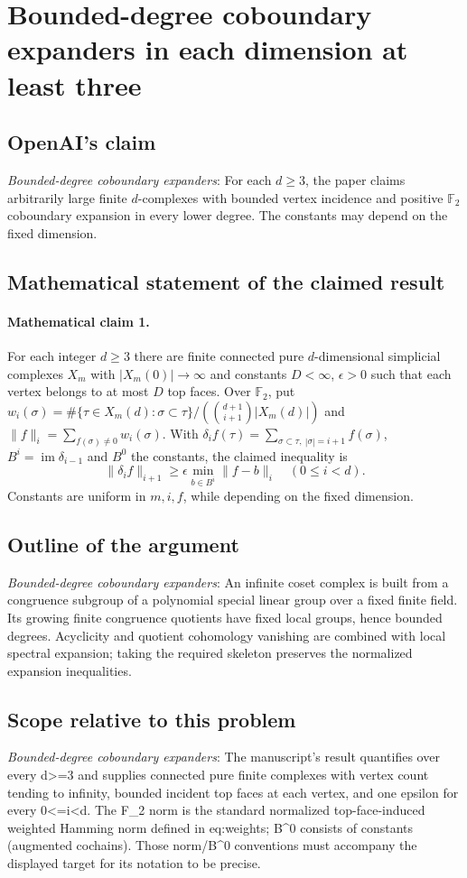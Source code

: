 \documentclass[11pt]{article}
\begin{document}
\section*{Bounded-degree coboundary expanders in each dimension at least three}

\subsection{OpenAI's claim}
\textit{Bounded-degree coboundary expanders}: For each $d\ge3$, the paper claims arbitrarily large finite $d$-complexes with bounded vertex incidence and positive $\mathbb F_2$ coboundary expansion in every lower degree. The constants may depend on the fixed dimension.

\subsection{Mathematical statement of the claimed result}
\paragraph{Mathematical claim 1.} For each integer $d\ge3$ there are finite connected pure $d$-dimensional simplicial complexes $X_m$ with $|X_m(0)|\to\infty$ and constants $D<\infty$, $\epsilon>0$ such that each vertex belongs to at most $D$ top faces. Over $\mathbb F_2$, put $w_i(\sigma)=\#\{\tau\in X_m(d):\sigma\subset\tau\}/(\binom{d+1}{i+1}|X_m(d)|)$ and $\|f\|_i=\sum_{f(\sigma)\ne0}w_i(\sigma)$. With $\delta_i f(\tau)=\sum_{\sigma\subset\tau,\ |\sigma|=i+1}f(\sigma)$, $B^i=\operatorname{im}\delta_{i-1}$ and $B^0$ the constants, the claimed inequality is \[\|\delta_i f\|_{i+1}\ge\epsilon\min_{b\in B^i}\|f-b\|_i\quad(0\le i<d).\] Constants are uniform in $m,i,f$, while depending on the fixed dimension.

\subsection{Outline of the argument}
\textit{Bounded-degree coboundary expanders}: An infinite coset complex is built from a congruence subgroup of a polynomial special linear group over a fixed finite field. Its growing finite congruence quotients have fixed local groups, hence bounded degrees. Acyclicity and quotient cohomology vanishing are combined with local spectral expansion; taking the required skeleton preserves the normalized expansion inequalities.

\subsection{Scope relative to this problem}
\textit{Bounded-degree coboundary expanders}: The manuscript’s result quantifies over every d>=3 and supplies connected pure finite complexes with vertex count tending to infinity, bounded incident top faces at each vertex, and one epsilon for every 0<=i<d. The F\_2 norm is the standard normalized top-face-induced weighted Hamming norm defined in eq:weights; B\textasciicircum{}0 consists of constants (augmented cochains). Those norm/B\textasciicircum{}0 conventions must accompany the displayed target for its notation to be precise.
\end{document}
